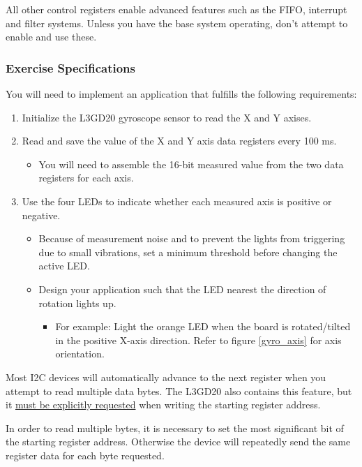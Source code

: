 \documentclass[openany,11pt,fleqn]{book} %
\begin{document}
All other control registers enable advanced features such as the FIFO, interrupt and filter systems. Unless you have the base system operating, don't attempt to enable and use these. 

\subsubsection{Exercise Specifications}
You will need to implement an application that fulfills the following requirements:
\begin{enumerate}
    \item Initialize the L3GD20 gyroscope sensor to read the X and Y axises.
    \item Read and save the value of the X and Y axis data registers every 100 ms.
    \begin{itemize}
        \item You will need to assemble the 16-bit measured value from the two data registers for each axis. 
    \end{itemize}
    \item Use the four LEDs to indicate whether each measured axis is positive or negative. 
    \begin{itemize}
        \item Because of measurement noise and to prevent the lights from triggering due to small vibrations, set a minimum threshold before changing the active LED.
        \item Design your application such that the LED nearest the direction of rotation lights up.
        \begin{itemize}
            \item For example: Light the orange LED when the board is rotated/tilted in the positive X-axis direction. Refer to figure \ref{gyro_axis} for axis orientation. 
        \end{itemize} 
    \end{itemize}
\end{enumerate}

\begin{warning}
    Most I2C devices will automatically advance to the next register when you attempt to read multiple data bytes. The L3GD20 also contains this feature, but it \underline{must be explicitly requested} when writing the starting register address. 
    
    In order to read multiple bytes, it is necessary to set the most significant bit of the starting register address. Otherwise the device will repeatedly send the same register data for each byte requested.
\end{warning}
\end{document}
